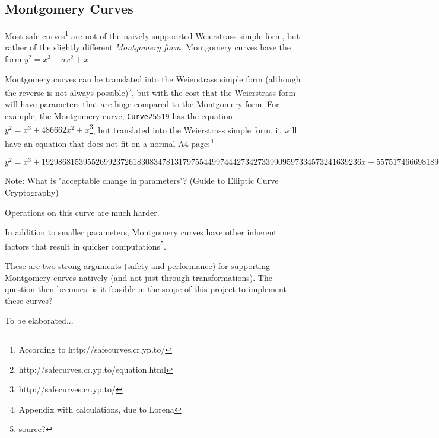\subsection{Montgomery Curves}

Most safe curves\footnote{According to http://safecurves.cr.yp.to/} are not of the naively suppoorted
Weierstrass simple form, but rather of the slightly different \emph{Montgomery form}. Montgomery curves
have the form \(y^2 = x^3 + ax^2 + x\).

Montgomery curves can be translated into the Weierstrass simple form (although the reverse is not always
possible)\footnote{http://safecurves.cr.yp.to/equation.html}, but with the cost that the Weierstrass form
will have parameters that are huge compared to the Montgomery form. For example, the Montgomery curve,
\verb|Curve25519| has the equation \(y^2 = x^3+486662x^2+x\)\footnote{http://safecurves.cr.yp.to/}, but
translated into the Weierstrass simple form, it will have an equation that does not fit on a normal A4
page:\footnote{Appendix with calculations, due to Lorena}

\(y^2 = x^3 + 19298681539552699237261830834781317975544997444273427339909597334573241639236x + 55751746669818908907645289078257140818241103727901012315294400837956729358436\)

Note: What is "acceptable change in parameters"? (Guide to Elliptic Curve Cryptography)

Operations on this curve are much harder.

In addition to smaller parameters, Montgomery curves have other inherent factors that result in quicker
computations\footnote{source?}.

These are two strong arguments (safety and performance) for supporting Montgomery curves natively (and
not just through transformations). The question then becomes: is it feasible in the scope of this
project to implement these curves?

To be elaborated...